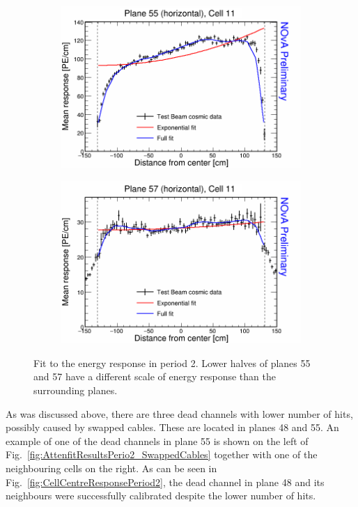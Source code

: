 \begin{figure}[h]
  \begin{subfigure}{0.495\textwidth}
    \includegraphics[width=\linewidth]{Plots/RelativeCalibrationResults/p2_055_011.png}
  \end{subfigure}
  \begin{subfigure}{0.495\textwidth}
    \includegraphics[width=\linewidth]{Plots/RelativeCalibrationResults/p2_057_011.png}
  \end{subfigure}
  \caption[Attenuation fits for cells in planes 55 and 57 in period 2 data]{Fit to the energy response in period 2. Lower halves of planes 55 and 57 have a different scale of energy response than the surrounding planes.}
  \label{fig:AttenfitResultsPerio2_FaultyFEB}
\end{figure}

As was discussed above, there are three dead channels with lower number of hits, possibly caused by swapped cables. These are located in planes 48 and 55. An example of one of the dead channels in plane 55 is shown on the left of Fig.~\ref{fig:AttenfitResultsPerio2_SwappedCables} together with one of the neighbouring cells on the right. As can be seen in Fig.~\ref{fig:CellCentreResponsePeriod2}, the dead channel in plane 48 and its neighbours were successfully calibrated despite the lower number of hits.

